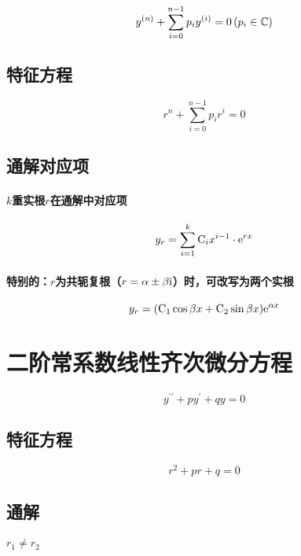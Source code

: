 \documentclass{article}
\begin{document}
\begin{definition}[]
    \[y^{\left(n\right)}+\sum_{i=0}^{n-1}p_iy^{\left(i\right)}=0\left(p_i\in\mathbb C\right)\]
\end{definition}

\subsection{特征方程}

\[r^n+\sum_{i=0}^{n-1}p_ir^i=0\]

\subsection{通解对应项}

\paragraph{$k$重实根$r$在通解中对应项}

\[y_r=\sum_{i=1}^k\mathrm C_ix^{i-1}\cdot\mathrm e^{rx}\]

\paragraph{特别的：$r$为共轭复根（$r=\alpha\pm\beta\mathrm i$）时，可改写为两个实根}

\[y_r=(\mathrm C_1\cos{\beta x}+\mathrm C_2\sin{\beta x})\mathrm e^{\alpha x}\]

\section{二阶常系数线性齐次微分方程}

\begin{definition}[]
    \[y^{\prime\prime}+py^\prime+qy=0\]
\end{definition}

\subsection{特征方程}

\[r^2+pr+q=0\]

\subsection{通解}

\paragraph{$r_1\neq r_2$}
\end{document}
